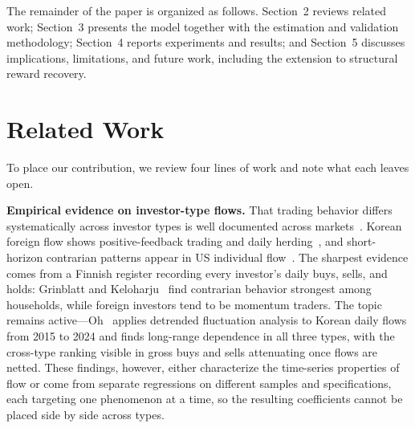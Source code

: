 \documentclass[sigconf,anonymous,review]{acmart}
\begin{document}
The remainder of the paper is organized as follows. Section~2 reviews
related work; Section~3 presents the model together with the estimation
and validation methodology; Section~4 reports experiments and results;
and Section~5 discusses implications, limitations, and future work,
including the extension to structural reward recovery.


\section{Related Work}
\label{sec:related}

To place our contribution, we review four lines of work and note what
each leaves open.

\textbf{Empirical evidence on investor-type flows.} That trading behavior
differs systematically across investor types is well documented across
markets~\cite{choe_kho_stulz,grinblatt_keloharju2001,kaniel_saar_titman}.
Korean foreign flow shows positive-feedback trading and daily
herding~\cite{choe_kho_stulz}, and short-horizon contrarian patterns
appear in US individual flow~\cite{kaniel_saar_titman}. The sharpest
evidence comes from a Finnish register recording every investor's daily
buys, sells, and holds: Grinblatt and
Keloharju~\cite{grinblatt_keloharju2001} find contrarian behavior
strongest among households, while foreign investors tend to be momentum
traders. The topic remains active---Oh~\cite{oh2025} applies detrended
fluctuation analysis to Korean daily flows from 2015 to 2024 and finds
long-range dependence in all three types, with the cross-type ranking
visible in gross buys and sells attenuating once flows are netted. These findings, however, either characterize the
time-series properties of flow or come from separate regressions on
different samples and specifications, each targeting one phenomenon at a
time, so the resulting coefficients cannot be placed side by side across
types.
\end{document}
